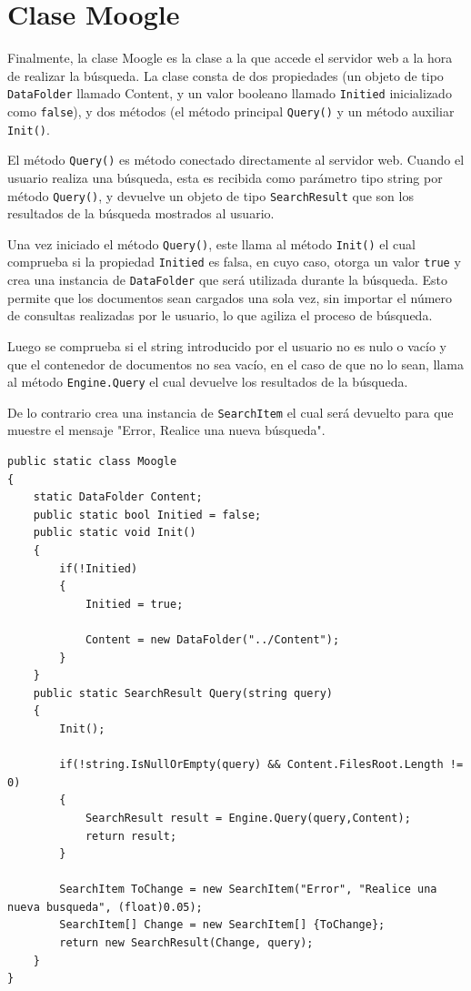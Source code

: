 \documentclass[12pt,a4paper]{report}
\begin{document}
\chapter*{Clase Moogle}

Finalmente, la clase Moogle es la clase a la que accede el servidor web a la hora de realizar la búsqueda. La clase consta de dos propiedades (un objeto de tipo \texttt{DataFolder} llamado Content, y un valor booleano llamado \texttt{Initied} inicializado como \texttt{false}), y dos métodos (el método principal \texttt{Query()} y un método auxiliar \texttt{Init()}.\par

El método \texttt{Query()} es método conectado directamente al servidor web. Cuando el usuario realiza una búsqueda, esta es recibida como parámetro tipo string por método \texttt{Query()}, y devuelve un objeto de tipo \texttt{SearchResult} que son los resultados de la búsqueda mostrados al usuario.\par

Una vez iniciado el método \texttt{Query()}, este llama al método \texttt{Init()} el cual comprueba si la propiedad \texttt{Initied} es falsa, en cuyo caso, otorga un valor \texttt{true} y crea una instancia de \texttt{DataFolder} que será utilizada durante la búsqueda. Esto permite que los documentos sean cargados una sola vez, sin importar el número de consultas realizadas por le usuario, lo que agiliza el proceso de búsqueda.\par

Luego se comprueba si el string introducido por el usuario no es nulo o vacío y que el contenedor de documentos no sea vacío, en el caso de que no lo sean, llama al método \texttt{Engine.Query} el cual devuelve los resultados de la búsqueda.

De lo contrario crea una instancia de \texttt{SearchItem} el cual será devuelto para que muestre el mensaje "Error, Realice una nueva búsqueda".

\begin{lstlisting}
public static class Moogle
{
    static DataFolder Content;
    public static bool Initied = false;
    public static void Init()
    {
        if(!Initied)
        {
            Initied = true;

            Content = new DataFolder("../Content");
        }
    }
    public static SearchResult Query(string query) 
    {   
        Init();
        
        if(!string.IsNullOrEmpty(query) && Content.FilesRoot.Length != 0)
        {   
            SearchResult result = Engine.Query(query,Content);
            return result;
        }

        SearchItem ToChange = new SearchItem("Error", "Realice una nueva busqueda", (float)0.05);
        SearchItem[] Change = new SearchItem[] {ToChange};
        return new SearchResult(Change, query);
    }
}
\end{lstlisting}
\end{document}
